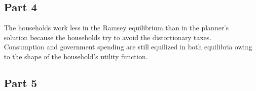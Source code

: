 \documentclass[11pt]{article} %
\begin{document}
\subsection{Part 4}
The households work less in the Ramsey equilibrium than in the planner's solution because the households try to avoid the distortionary taxes.  Consumption and government spending are still equilized in both equilibria owing to the shape of the household's utility function.
\subsection{Part 5}
\end{document}
